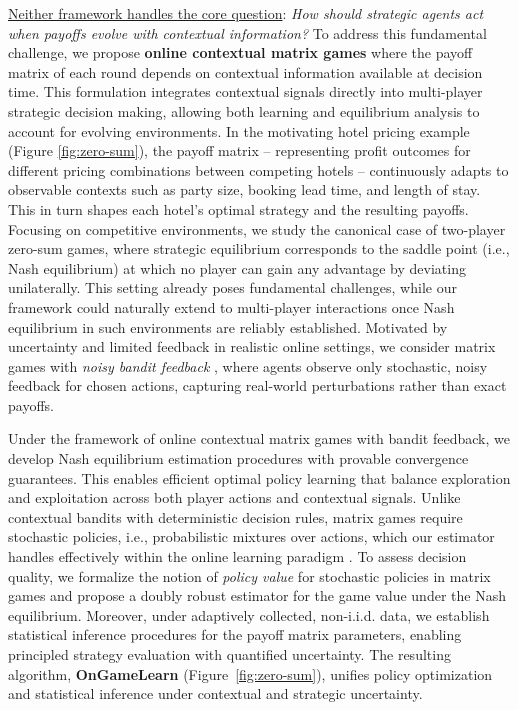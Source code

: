 \documentclass[12pt]{article}
\begin{document}
\underline{Neither framework handles the core question}: \textit{How should strategic agents act when payoffs evolve with contextual information?}
To address this fundamental challenge, we propose \textbf{online contextual matrix games} where the payoff matrix of each round depends on contextual information available at decision time. This formulation integrates contextual signals directly into multi-player strategic decision making, allowing both learning and equilibrium analysis to account for evolving environments. 
In the motivating hotel pricing example (Figure \ref{fig:zero-sum}), the payoff matrix -- representing profit outcomes for different pricing combinations between competing hotels -- continuously adapts to observable contexts such as party size, booking lead time, and length of stay. This in turn shapes each hotel's optimal strategy and the resulting payoffs. 
Focusing on competitive environments, we study the canonical case of two-player zero-sum games, where strategic equilibrium corresponds to the saddle point (i.e., Nash equilibrium) at which no player can gain any advantage by deviating unilaterally. This setting already poses fundamental challenges, while our framework could naturally extend to multi-player interactions once Nash equilibrium in such environments are reliably established.
Motivated by uncertainty and limited feedback in realistic online settings, we consider matrix games with \textit{noisy bandit feedback} \citep{lattimore2020bandit,o2021matrix}, where agents observe only stochastic, noisy feedback for chosen actions, capturing real-world perturbations rather than exact payoffs. 

Under the framework of online contextual matrix games with bandit feedback, we develop Nash equilibrium estimation procedures with provable convergence guarantees. 
This enables efficient optimal policy learning that balance exploration and exploitation across both player actions and contextual signals. Unlike contextual bandits with deterministic decision rules, matrix games require stochastic policies, i.e., probabilistic mixtures over actions, which our estimator handles effectively within the online learning paradigm \citep{li2011unbiased,dudik2011doubly,kallus2018policy}. To assess decision quality, we formalize the notion of \textit{policy value} for stochastic policies in matrix games and propose a doubly robust estimator for the game value under the Nash equilibrium. Moreover, under adaptively collected, non-i.i.d. data, we establish statistical inference procedures for the payoff matrix parameters, enabling principled strategy evaluation with quantified uncertainty. The resulting algorithm, \textbf{OnGameLearn} (Figure~\ref{fig:zero-sum}), unifies policy optimization and statistical inference under contextual and strategic uncertainty.
\end{document}
